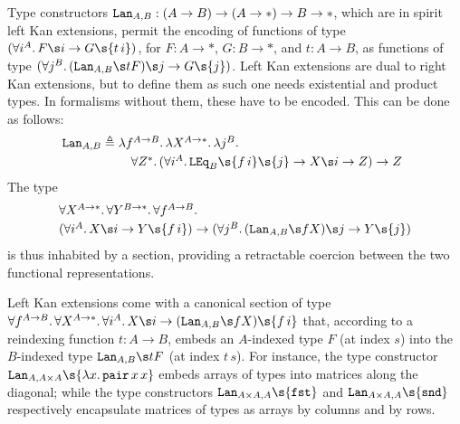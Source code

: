 Type constructors ${\mathtt{Lan}_{A,B}:(A\to B)\to (A\to*)\to B\to *}$, which are
in spirit left Kan extensions, permit the encoding of functions of type
$(\forall i^{A}.\, F\s i\to G\s{t\,i})$, for ${F:A\to*}$, ${G:B\to*}$, and
${t:A\to B}$, as functions of type $(\forall j^{B}.\, (\Lan_{A,B}\s t F)\s
j\to G\s{j})$.  Left Kan extensions are dual to right Kan extensions, but
to define them as such one needs existential and product types.  In
formalisms without them, these have to be encoded.  This can be done as
follows: 
\[
\Lan_{A,B}
\triangleq
\!\!\!
\begin{array}[t]{l}
\l f^{A\to B}.\,
\l X^{A\to*}.\,
\l j^{B}.\, 
\\[1mm]
\quad
\forall Z^{*}.\,
  (\forall i^A.\, \LEq_B\s{f\,i}\s{j}\to X\s i\to Z)\to Z
\end{array}
\]
The type 
\[\begin{array}{l}
\forall X^{A\to*}.\,
\forall Y^{B\to*}.\,
\forall f^{A\to B}.\,
\\[1mm]
(\forall i^{A}.\, 
X\s i\to Y\s{f\,i})
\to
(\forall j^{B}.\, 
(\Lan_{A,B}\s f X)\s j\to Y\s{j})
\end{array}\]
is thus inhabited by a section, providing a retractable coercion between
the two functional representations.

Left Kan extensions come with a canonical section of type
$\forall f^{A\to B}.\,\forall X^{A\to *}.\,\forall i^A.\, X\s i \to
(\Lan_{A,B}\s f X)\s{f\,i}$ that, according to a reindexing function
$t:A\to B$, embeds an \mbox{$A$-indexed} type $F$ (at index $s$) into
the $B$-indexed type $\Lan_{A,B}\s t F$ (at index $t\,s$).  For instance, the
type constructor $\mathtt{Lan}_{A,A\times A}\s{\l x.\,\mathtt{pair}\,x\,x}$
embeds arrays of types into matrices along the diagonal; while the type
constructors $\mathtt{Lan}_{A\times A,A}\s{\mathtt{fst}}$ and
$\mathtt{Lan}_{A\times A,A}\s{\mathtt{snd}}$ respectively encapsulate matrices
of types as arrays by columns and by rows.

